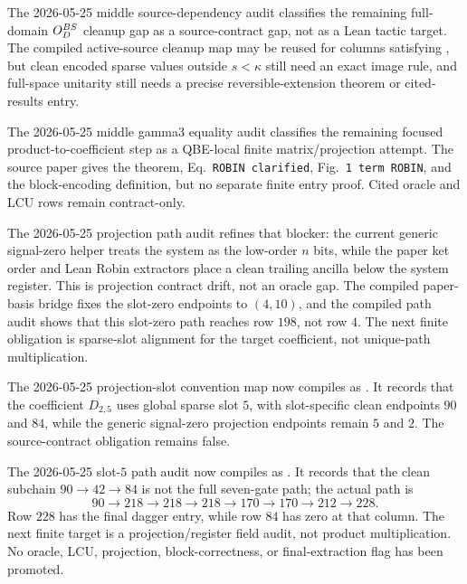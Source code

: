 The 2026-05-25 middle source-dependency audit classifies the remaining
full-domain \(O_D^{BS}\) cleanup gap as a source-contract gap, not as a Lean
tactic target.  The compiled active-source cleanup map may be reused for
columns satisfying , but clean
encoded sparse values outside \(s<\kappa\) still need an exact image rule, and
full-space unitarity still needs a precise reversible-extension theorem or
cited-results entry.

The 2026-05-25 middle gamma3 equality audit classifies the remaining focused
product-to-coefficient step as a QBE-local finite matrix/projection attempt.
The source paper gives the theorem, Eq.~\texttt{ROBIN clarified},
Fig.~\texttt{1 term ROBIN}, and the block-encoding definition, but no separate
finite entry proof.  Cited oracle and LCU rows remain contract-only.

The 2026-05-25 projection path audit refines that blocker: the current generic
signal-zero helper treats the system as the low-order \(n\) bits, while the
paper ket order and Lean Robin extractors place a clean trailing ancilla below
the system register.  This is projection contract drift, not an oracle gap.
The compiled paper-basis bridge fixes the slot-zero endpoints to \((4,10)\),
and the compiled path audit shows that this slot-zero path reaches row \(198\),
not row \(4\).  The next finite obligation is sparse-slot alignment for the
target coefficient, not unique-path multiplication.

The 2026-05-25 projection-slot convention map now compiles as
.
It records that the coefficient \(D_{2,5}\) uses global sparse slot \(5\), with
slot-specific clean endpoints \(90\) and \(84\), while the generic
signal-zero projection endpoints remain \(5\) and \(2\).  The source-contract
obligation
 remains false.

The 2026-05-25 slot-\(5\) path audit now compiles as
.  It
records that the clean subchain \(90 \to 42 \to 84\) is not the full seven-gate
path; the actual path is
\[
  90 \to 218 \to 218 \to 218 \to 170 \to 170 \to 212 \to 228.
\]
Row \(228\) has the final dagger entry, while row \(84\) has zero at that
column.  The next finite target is a projection/register field audit, not
product multiplication.  No oracle, LCU, projection, block-correctness, or
final-extraction flag has been promoted.


